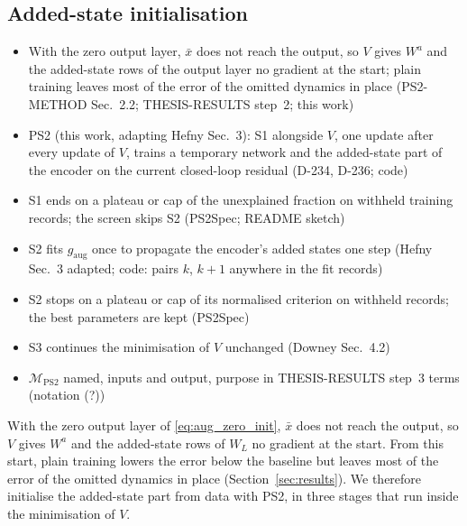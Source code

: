 \subsection{Added-state initialisation}\label{sec:aug_ps2}
\ifdraft
\begin{itemize}
\item With the zero output layer, $\bar x$ does not reach the output, so $V$ gives $W^a$ and the added-state rows of the output layer no gradient at the start; plain training leaves most of the error of the omitted dynamics in place (PS2-METHOD Sec.~2.2; THESIS-RESULTS step~2; this work)
\item PS2 (this work, adapting Hefny Sec.~3): S1 alongside $V$, one update after every update of $V$, trains a temporary network and the added-state part of the encoder on the current closed-loop residual (D-234, D-236; code)
\item S1 ends on a plateau or cap of the unexplained fraction on withheld training records; the screen skips S2 (PS2Spec; README sketch)
\item S2 fits $g_{\mathrm{aug}}$ once to propagate the encoder's added states one step (Hefny Sec.~3 adapted; code: pairs $k$, $k+1$ anywhere in the fit records)
\item S2 stops on a plateau or cap of its normalised criterion on withheld records; the best parameters are kept (PS2Spec)
\item S3 continues the minimisation of $V$ unchanged (Downey Sec.~4.2)
\item $\mathcal M_{\mathrm{PS2}}$ named, inputs and output, purpose in THESIS-RESULTS step~3 terms (notation (?))
\end{itemize}
\fi

With the zero output layer of \eqref{eq:aug_zero_init}, $\bar x$ does not
reach the output, so $V$ gives $W^a$ and the added-state rows of $W_L$ no
gradient at the start.
From this start, plain training lowers the error below the baseline but
leaves most of the error of the omitted dynamics in place
(Section~\ref{sec:results}).
We therefore initialise the added-state part from data with PS2, in three
stages that run inside the minimisation of $V$.

